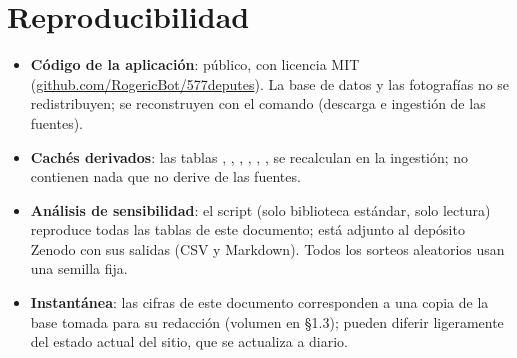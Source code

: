 \section{Reproducibilidad}\label{sec:repro-es}
\begin{itemize}
  \item \textbf{Código de la aplicación}: público, con licencia MIT
        (\href{https://github.com/RogericBot/577deputes}{github.com/RogericBot/577deputes}).
        La base de datos y las fotografías no se redistribuyen; se reconstruyen con
        el comando  (descarga e ingestión de las fuentes).
  \item \textbf{Cachés derivados}: las tablas ,
        , ,
        , , ,
         se recalculan en la ingestión; no contienen nada que no
        derive de las fuentes.
  \item \textbf{Análisis de sensibilidad}: el script 
        (solo biblioteca estándar, solo lectura) reproduce todas las tablas de este
        documento; está adjunto al depósito Zenodo con sus salidas (CSV y Markdown).
        Todos los sorteos aleatorios usan una semilla fija.
  \item \textbf{Instantánea}: las cifras de este documento corresponden a una copia
        de la base tomada para su redacción (volumen en §1.3); pueden diferir
        ligeramente del estado actual del sitio, que se actualiza a diario.
\end{itemize}

